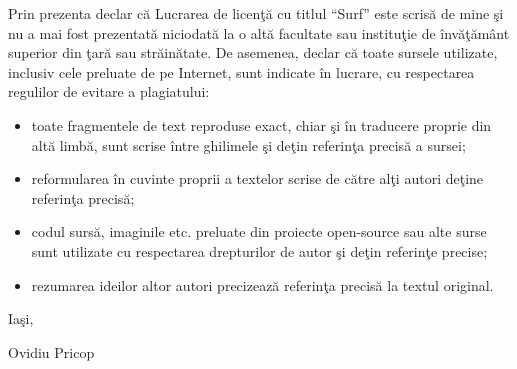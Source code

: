 Prin prezenta declar c\u{a} Lucrarea de licen\c{t}\u{a} cu titlul  \enquote{Surf} este scris\u{a} de mine \c{s}i nu a mai fost prezentat\u{a} niciodat\u{a} la o alt\u{a} facultate sau institu\c{t}ie de \^{i}nv\u{a}\c{t}\u{a}m\^{a}nt superior din \c{t}ar\u{a} sau str\u{a}in\u{a}tate. De asemenea, declar c\u{a} toate sursele utilizate, inclusiv cele preluate de pe Internet, sunt indicate \^{i}n lucrare, cu respectarea regulilor de evitare a plagiatului:

\begin{itemize}
	
	\item {toate fragmentele de text reproduse exact, chiar \c{s}i \^{i}n traducere proprie din alt\u{a} limb\u{a}, sunt scrise \^{i}ntre ghilimele \c{s}i de\c{t}in referin\c{t}a precis\u{a} a sursei;}
	      
	\item {reformularea \^{i}n cuvinte proprii a textelor scrise de c\u{a}tre al\c{t}i autori de\c{t}ine referin\c{t}a precis\u{a};}
	      
	\item {codul surs\u{a}, imaginile etc. preluate din proiecte open-source sau alte surse sunt utilizate cu respectarea drepturilor de autor \c{s}i de\c{t}in referin\c{t}e precise;}
	      
	\item {rezumarea ideilor altor autori precizeaz\u{a} referin\c{t}a precis\u{a} la textul original.}
	
\end{itemize}

\begin{bottompar}
	\begin{flushleft}
		Ia\c{s}i, \GLOBALDATE
	\end{flushleft}

	\vspace{0.5cm}
	\begin{flushright}
		Ovidiu Pricop
	\end{flushright}
\end{bottompar}